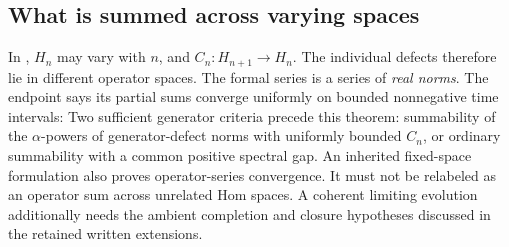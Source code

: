 \subsection{What is summed across varying spaces}
In , $H_n$ may vary with $n$, and $C_n:H_{n+1}\to H_n$. The individual defects therefore lie in different operator spaces. The formal series is a series of \emph{real norms}. The endpoint says its partial sums converge uniformly on bounded nonnegative time intervals:
Two sufficient generator criteria precede this theorem: summability of the $\alpha$-powers of generator-defect norms with uniformly bounded $C_n$, or ordinary summability with a common positive spectral gap. An inherited fixed-space formulation also proves operator-series convergence. It must not be relabeled as an operator sum across unrelated Hom spaces. A coherent limiting evolution additionally needs the ambient completion and closure hypotheses discussed in the retained written extensions.

